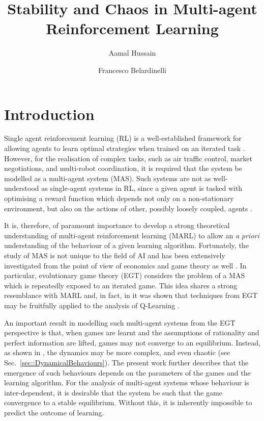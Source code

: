 \documentclass[sigconf,anonymous]{aamas}
\title[InstabilityinMARL]{Stability and Chaos in Multi-agent Reinforcement Learning}
\author{Aamal Hussain}
\affiliation{
  \department{Department of Computing}
  \institution{Imperial College London}}
\author{Francesco Belardinelli}
\affiliation{
  \department{Department of Computing}
  \institution{Imperial College London}}
\begin{document}

\pagestyle{fancy}
\fancyhead{}


\maketitle 


\section{Introduction}
\label{sec::Intro}

Single agent reinforcement learning (RL) is a well-established
framework for allowing agents to learn optimal strategies when trained
on an iterated task
\cite{Vinyals2019}. However, for the realisation of complex tasks,
such as air traffic control, market negotiations, and multi-robot
coordination, it is required that the system be modelled as a
multi-agent system (MAS). Such systems are not as well-understood as
single-agent systems in RL, since a given agent is tasked with
optimising a reward function which depends not only on a
non-stationary environment, but also on the actions of other, possibly
loosely coupled, agents \cite{SchwartzMulti-agentApproach}.

It is, therefore, of paramount importance to develop a strong
theoretical understanding of multi-agent reinforcement learning (MARL)
to allow an {\em a priori} understanding of the behaviour of a given
learning algorithm. Fortunately, the study of MAS is not unique to the
field of AI and has been extensively investigated from the point of view of
economics and game theory as well
\cite{ShohamMultiagentFoundations}. In particular,
evolutionary game theory (EGT) considers the problem of a MAS which is
repeatedly exposed to an iterated game. This idea shares a strong
resemblance with MARL and, in fact, in \cite{Tuyls2006AnGames} it was
shown that techniques from EGT may be fruitfully applied to the analysis of
Q-Learning \cite{Sutton2018}.

An important result in modelling such multi-agent systems from the EGT
perspective is that, when games are learnt and the assumptions of
rationality and perfect information are lifted, games may not converge
to an equilibrium. Instead, as shown in \cite{Sanders2018}, the
dynamics may be more complex, and even chaotic (see
Sec.~\ref{sec::DynamicalBehaviours}). The present work further
describes that the emergence of such behaviours depends on the
parameters of the games and the learning algorithm. For the analysis
of multi-agent systems whose behaviour is inter-dependent, it is
desirable that the system be such that the game convergence to a
stable equilibrium. Without this, it is inherently impossible to
predict the outcome of learning.
\end{document}
